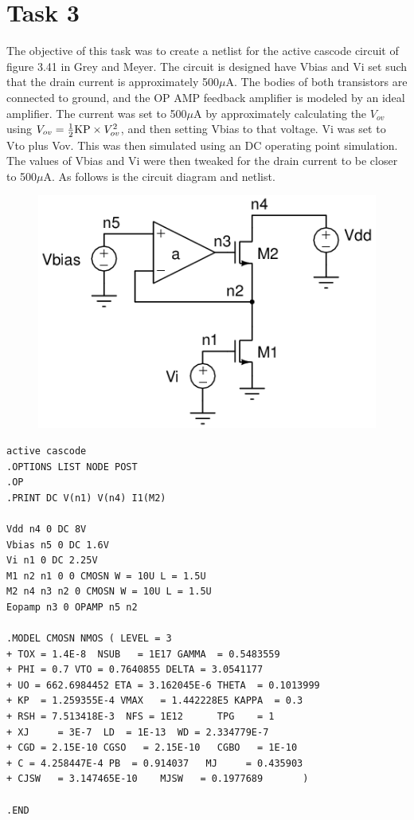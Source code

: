 \documentclass[12pt]{article}
\begin{document}
\section*{Task 3}
The objective of this task was to create a netlist for the active cascode circuit of figure 3.41 in Grey and Meyer. The circuit is designed have Vbias and Vi set such that the drain current is approximately 500$\mu$A. The bodies of both transistors are connected to ground, and the OP AMP feedback amplifier is modeled by an ideal amplifier. The current was set to 500$\mu$A by approximately calculating the $V_{ov}$ using $V_{ov} = \frac{1}{2}\textnormal{KP}\times V_{ov}^2$, and then setting Vbias to that voltage. Vi was set to Vto plus Vov. This was then simulated using an DC operating point simulation. The values of Vbias and Vi were then tweaked for the drain current to be closer to 500$\mu$A. As follows is the circuit diagram and netlist.
\FloatBarrier 
\begin{figure}[h!]
\begin{center}
 \includegraphics[scale=0.7]{./3.png}
\end{center}
\end{figure}
\FloatBarrier
\begin{lstlisting}
active cascode
.OPTIONS LIST NODE POST
.OP
.PRINT DC V(n1) V(n4) I1(M2)  

Vdd n4 0 DC 8V 
Vbias n5 0 DC 1.6V
Vi n1 0 DC 2.25V 
M1 n2 n1 0 0 CMOSN W = 10U L = 1.5U
M2 n4 n3 n2 0 CMOSN W = 10U L = 1.5U
Eopamp n3 0 OPAMP n5 n2 

.MODEL CMOSN NMOS ( LEVEL = 3 
+ TOX = 1.4E-8  NSUB   = 1E17 GAMMA  = 0.5483559          
+ PHI = 0.7 VTO = 0.7640855 DELTA = 3.0541177 
+ UO = 662.6984452 ETA = 3.162045E-6 THETA  = 0.1013999          
+ KP  = 1.259355E-4 VMAX   = 1.442228E5 KAPPA  = 0.3             
+ RSH = 7.513418E-3  NFS = 1E12      TPG    = 1                     
+ XJ     = 3E-7  LD  = 1E-13  WD = 2.334779E-7
+ CGD = 2.15E-10 CGSO   = 2.15E-10   CGBO   = 1E-10        
+ C = 4.258447E-4 PB  = 0.914037   MJ     = 0.435903 
+ CJSW   = 3.147465E-10    MJSW   = 0.1977689       )                                     

.END
\end{lstlisting}
\end{document}
